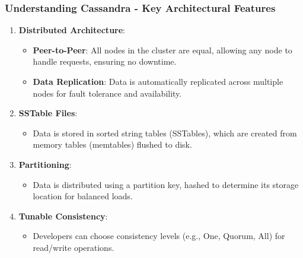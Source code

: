 \documentclass[aspectratio=169]{beamer}
\begin{document}
\begin{frame}[fragile]
    \frametitle{Understanding Cassandra - Key Architectural Features}
    \begin{enumerate}
        \item \textbf{Distributed Architecture}:
            \begin{itemize}
                \item \textbf{Peer-to-Peer}: All nodes in the cluster are equal, allowing any node to handle requests, ensuring no downtime.
                \item \textbf{Data Replication}: Data is automatically replicated across multiple nodes for fault tolerance and availability.
            \end{itemize}
        
        \item \textbf{SSTable Files}:
            \begin{itemize}
                \item Data is stored in sorted string tables (SSTables), which are created from memory tables (memtables) flushed to disk.
            \end{itemize}
        
        \item \textbf{Partitioning}:
            \begin{itemize}
                \item Data is distributed using a partition key, hashed to determine its storage location for balanced loads.
            \end{itemize}
        
        \item \textbf{Tunable Consistency}:
            \begin{itemize}
                \item Developers can choose consistency levels (e.g., One, Quorum, All) for read/write operations.
            \end{itemize}
    \end{enumerate}
\end{frame}
\end{document}
